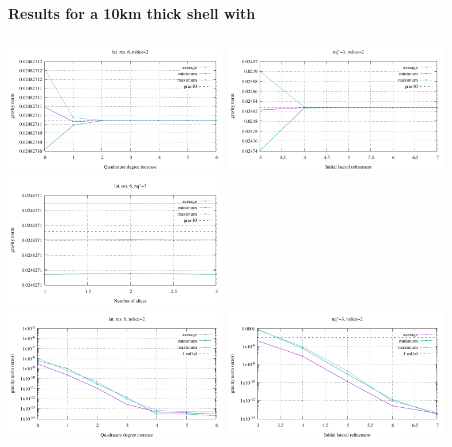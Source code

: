 \paragraph{Results for a 10km thick shell with \aspect{}}

\begin{center}
\includegraphics[width=5.7cm]{./images/benchmark_gravity/bench1/grav_nqplus}
\includegraphics[width=5.7cm]{./images/benchmark_gravity/bench1/grav_latres}
\includegraphics[width=5.7cm]{./images/benchmark_gravity/bench1/grav_nslice}\\
\includegraphics[width=5.7cm]{./images/benchmark_gravity/bench1/grav_nqplus_error}
\includegraphics[width=5.7cm]{./images/benchmark_gravity/bench1/grav_latres_error}

\end{center}
